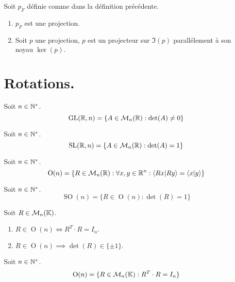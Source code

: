 \begin{proposition}
    Soit $p_F$ définie comme dans la définition précédente.
    \begin{enumerate}
        \item $p_F$ est une projection.
        \item Soit $p$ une projection, $p$ est un projecteur sur $\Im(p)$ parallélement à son noyau $\ker(p)$.
    \end{enumerate}
\end{proposition}

\section{Rotations.}
\begin{definition}
	Soit $n \in \mathbb{N}^*$.
    \[ \operatorname{GL}(\mathbb{R}, n) = \{ A \in \mathcal{M}_n(\mathbb{R}) : \det(A) \neq 0 \} \]
\end{definition}

\begin{definition}
	Soit $n \in \mathbb{N}^*$.
    \[ \operatorname{SL}(\mathbb{R}, n) = \{ A \in \mathcal{M}_n(\mathbb{R}) : \det(A) = 1 \} \]
\end{definition}

\begin{definition}
	Soit $n \in \mathbb{N}^*$.
    \[ \operatorname{O}(n) = \{ R \in \mathcal{M}_n(\mathbb{R}) : \forall x, y \in \mathbb{R}^n : \langle Rx|Ry \rangle = \langle x|y \rangle \} \]
\end{definition}

\begin{definition}
    Soit $n \in \mathbb{N}^*$.
    \[ \operatorname{SO}(n) = \{ R \in \operatorname{O}(n) : \det(R) = 1 \} \]
\end{definition}

\begin{proposition}
	Soit $R \in \mathcal{M}_n(\mathbb{K})$.
    \begin{enumerate}
        \item $R \in \operatorname{O}(n) \iff R^T \cdot R = I_n$.
        \item $R \in \operatorname{O}(n) \implies \det(R) \in \{ \pm 1 \}$.
    \end{enumerate}
\end{proposition}

\begin{corollary}
	Soit $n \in \mathbb{N}^*$.
    \[ \operatorname{O}(n) = \{ R \in \mathcal{M}_n(\mathbb{K}) : R^T \cdot R = I_n \} \]
\end{corollary}

